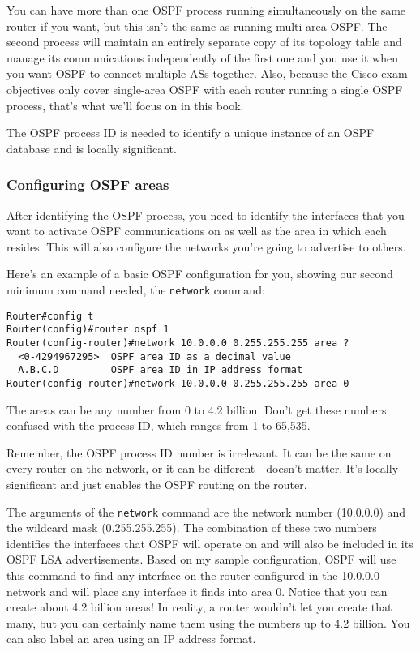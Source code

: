 \protect\hypertarget{c18.xhtmlux5cux23Page_754}{}{}You can have more
than one OSPF process running simultaneously on the same router if you
want, but this isn't the same as running multi-area OSPF. The second
process will maintain an entirely separate copy of its topology table
and manage its communications independently of the first one and you use
it when you want OSPF to connect multiple ASs together. Also, because
the Cisco exam objectives only cover single-area OSPF with each router
running a single OSPF process, that's what we'll focus on in this book.


\begin{note}
The OSPF process ID is needed to identify a unique instance of an OSPF database and is locally significant.
\end{note}


\subsubsection{Configuring OSPF areas}

After identifying the OSPF process, you need to identify the interfaces
that you want to activate OSPF communications on as well as the area in
which each resides. This will also configure the networks you're going
to advertise to others.

Here's an example of a basic OSPF configuration for you, showing our
second minimum command needed, the \texttt{network} command:

\begin{verbatim}
Router#config t
Router(config)#router ospf 1
Router(config-router)#network 10.0.0.0 0.255.255.255 area ?
  <0-4294967295>  OSPF area ID as a decimal value
  A.B.C.D         OSPF area ID in IP address format
Router(config-router)#network 10.0.0.0 0.255.255.255 area 0
\end{verbatim}

\begin{note}
The areas can be any number from 0 to 4.2 billion.
Don't get these numbers confused with the process ID, which ranges from 1 to 65,535.
\end{note}

Remember, the OSPF process ID number is irrelevant. It can be the same
on every router on the network, or it can be different---doesn't matter.
It's locally significant and just enables the OSPF routing on the
router.

The arguments of the \texttt{network} command are the network number
(10.0.0.0) and the wildcard mask (0.255.255.255). The combination of
these two numbers identifies the interfaces that OSPF will operate on
and will also be included in its OSPF LSA advertisements. Based on my
sample configuration, OSPF will use this command to find any interface
on the router configured in the 10.0.0.0 network and will place any
interface it finds into area 0.
\protect\hypertarget{c18.xhtmlux5cux23Page_755}{}{}Notice that you can
create about 4.2 billion areas! In reality, a router wouldn't let you
create that many, but you can certainly name them using the numbers up
to 4.2 billion. You can also label an area using an IP address format.


